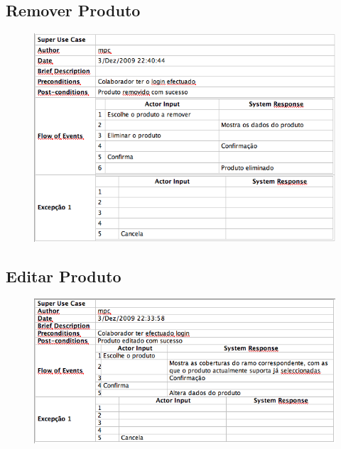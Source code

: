 \subsection{Remover Produto}
\begin{figure}[!htb]
	\centering
	\includegraphics[scale=0.50]{images/Prints/ConfiguracaoProdutos/RemoverProduto.png}
\end{figure}

\pagebreak

\subsection{Editar Produto}
\begin{figure}[!htb]
	\centering
	\includegraphics[scale=0.70]{images/Prints/ConfiguracaoProdutos/EditarProduto.png}
\end{figure}


\pagebreak


